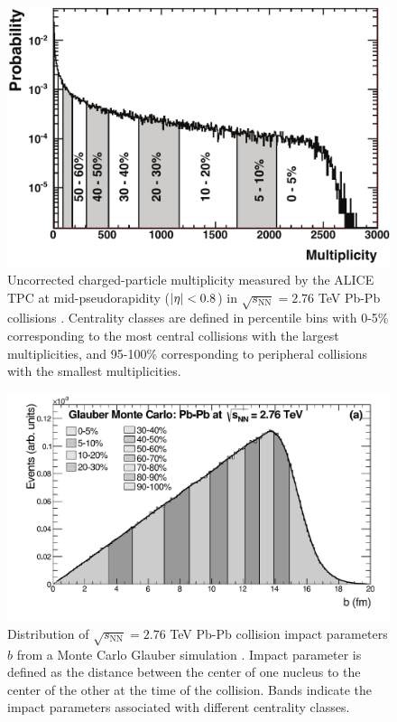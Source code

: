 \begin{figure}[hbt]
\includegraphics[width=36pc]{Figures/BorrowedFigures/NpartCentrality.pdf}
\caption[Charged-particle multiplicity distribution used for centrality definition]{
Uncorrected charged-particle multiplicity measured by the ALICE TPC at mid-pseudorapidity ($\left\lvert\eta\right\rvert < 0.8$) in $\sqrt{s_\mathrm{NN}} = 2.76$ TeV Pb-Pb collisions \cite{Aamodt:2010pa}.
Centrality classes are defined in percentile bins with 0-5\% corresponding to the most central collisions with the largest multiplicities, and 95-100\% corresponding to peripheral collisions with the smallest multiplicities.}
\label{fig:NpartCentrality}
\end{figure}
\begin{figure}[hbt]
\includegraphics[width=36pc]{Figures/BorrowedFigures/GlauberImpactParameter.pdf}
\caption[Monte Carlo Glauber impact parameter simulation]{Distribution of $\sqrt{s_\mathrm{NN}} = 2.76$ TeV Pb-Pb collision impact parameters $b$ from a Monte Carlo Glauber simulation \cite{Abelev:2013xaa}.
Impact parameter is defined as the distance between the center of one nucleus to the center of the other at the time of the collision.
Bands indicate the impact parameters associated with different centrality classes.
}
\label{fig:GlauberImpactParameter}
\end{figure}
